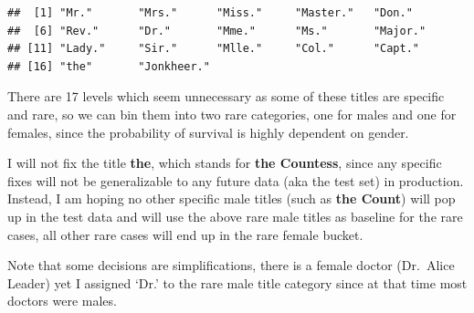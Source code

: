 \documentclass[]{article}
\newenvironment{Shaded}{\begin{snugshade}}{\end{snugshade}}
\newcommand{\KeywordTok}[1]{\textcolor[rgb]{0.13,0.29,0.53}{\textbf{#1}}}
\newcommand{\DataTypeTok}[1]{\textcolor[rgb]{0.13,0.29,0.53}{#1}}
\newcommand{\DecValTok}[1]{\textcolor[rgb]{0.00,0.00,0.81}{#1}}
\newcommand{\CharTok}[1]{\textcolor[rgb]{0.31,0.60,0.02}{#1}}
\newcommand{\StringTok}[1]{\textcolor[rgb]{0.31,0.60,0.02}{#1}}
\newcommand{\CommentTok}[1]{\textcolor[rgb]{0.56,0.35,0.01}{\textit{#1}}}
\newcommand{\ControlFlowTok}[1]{\textcolor[rgb]{0.13,0.29,0.53}{\textbf{#1}}}
\newcommand{\OperatorTok}[1]{\textcolor[rgb]{0.81,0.36,0.00}{\textbf{#1}}}
\newcommand{\NormalTok}[1]{#1}
\begin{document}
\begin{Shaded}
\end{Shaded}

\begin{verbatim}
##  [1] "Mr."       "Mrs."      "Miss."     "Master."   "Don."     
##  [6] "Rev."      "Dr."       "Mme."      "Ms."       "Major."   
## [11] "Lady."     "Sir."      "Mlle."     "Col."      "Capt."    
## [16] "the"       "Jonkheer."
\end{verbatim}

There are 17 levels which seem unnecessary as some of these titles are
specific and rare, so we can bin them into two rare categories, one for
males and one for females, since the probability of survival is highly
dependent on gender.

I will not fix the title \textbf{the}, which stands for \textbf{the
Countess}, since any specific fixes will not be generalizable to any
future data (aka the test set) in production. Instead, I am hoping no
other specific male titles (such as \textbf{the Count}) will pop up in
the test data and will use the above rare male titles as baseline for
the rare cases, all other rare cases will end up in the rare female
bucket.

Note that some decisions are simplifications, there is a female doctor
(Dr.~Alice Leader) yet I assigned `Dr.' to the rare male title category
since at that time most doctors were males.
\end{document}
